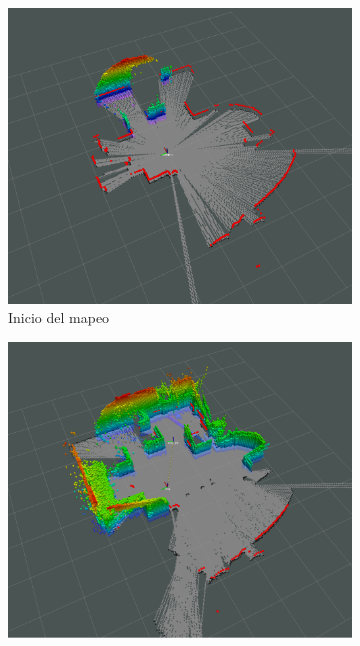\begin{figure}[H]
    \centering
    \begin{subfigure}[b]{0.30\textwidth}
    \includegraphics[width=\textwidth, height=\textwidth]{figures/05experimentacion/ambiente_4/r03_01.png}
    \caption{Inicio del mapeo}
    \label{fig:ambiente_4_1}
    \end{subfigure}
    \begin{subfigure}[b]{0.30\textwidth}
    \includegraphics[width=\textwidth, height=\textwidth]{figures/05experimentacion/ambiente_4/r03_02.png}

\end{subfigure}
\end{figure}
